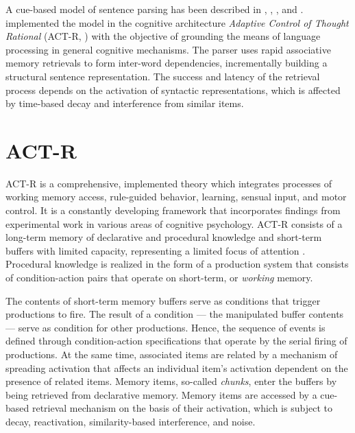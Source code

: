 \documentclass{cambridge7A}\usepackage[]{graphicx}\usepackage[]{color}
\begin{document}
A cue-based model of sentence parsing has been described in 
\cite{VanDykeLewis2003}, \cite{LewisVasishth2005}, \cite{LewisVasishthVanDyke2006}, and \cite{VasishthLewis2006}. 
\cite{LewisVasishth2005} implemented the model in the cognitive architecture  \emph{Adaptive Control of Thought Rational}  (ACT-R, \citealp{AndersonLebiere1998, AndersonEtAl2004}) with the objective of grounding the means of language processing in general cognitive mechanisms.
The parser uses rapid associative memory retrievals to form inter-word dependencies, incrementally building a structural sentence representation. The success and latency of the retrieval process depends on the activation of syntactic representations, which is affected by time-based decay and interference from similar items. 

\section{ACT-R}
ACT-R is a  comprehensive, implemented theory which integrates processes of working memory access, rule-guided behavior, learning, sensual input, and motor control. 
It is a constantly developing framework that incorporates  findings from experimental work in various areas of cognitive psychology. 
ACT-R consists of a long-term memory of  declarative and  procedural knowledge and  short-term buffers with  limited capacity, representing a limited  focus of attention \citep{McElree2006,Cowan2001,Miller1956}. 
Procedural knowledge is realized in the form of a production system \citep{Newell1973,Newell1978} that consists of condition-action pairs that operate on short-term, or \emph{working} memory. 

The contents of short-term memory buffers serve as conditions that trigger productions to fire. The result of a condition --- the manipulated buffer contents --- serve as condition for other productions. Hence, the  sequence of events is defined through condition-action specifications that operate by the serial firing of productions. 
At the same time, associated items are related by a mechanism of spreading activation that affects an individual item's activation dependent on the presence of related items. Memory items, so-called  \emph{chunks}, enter the buffers by being retrieved from  declarative memory. 
Memory items are accessed by a cue-based retrieval mechanism on the basis of their activation, which is subject to  decay,  reactivation,  similarity-based interference, and  noise.
\end{document}
